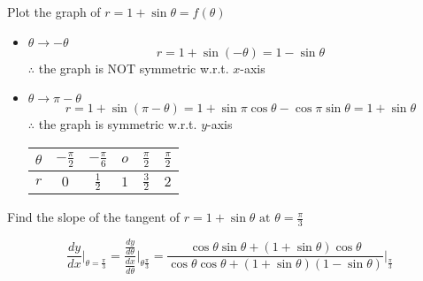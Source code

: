 \begin{eg}
Plot the graph of \(r = 1 + \sin \theta = f(\theta)\)
\begin{itemize}
\item \(\theta \to -\theta\)
\[r = 1 + \sin (-\theta) = 1 - \sin \theta\]
\(\therefore\) the graph is NOT symmetric w.r.t. \(x\)-axis 
\item \(\theta \to \pi - \theta\)
\[r = 1 + \sin (\pi - \theta) = 1 + \sin\pi \cos \theta - \cos\pi \sin \theta = 1 + \sin\theta\]
\(\therefore\) the graph is symmetric w.r.t. \(y\)-axis
\begin{center}
\begin{tabular}{c|c|c|c|c|c}
\(\theta\) & \(\displaystyle - \frac{\pi}{2}\) & \(\displaystyle - \frac{\pi}{6}\) & \(o\) & \(\displaystyle \frac{\pi}{2}\) & \(\displaystyle \frac{\pi}{2}\)\\ \hline
\(r\) & \(0\) & \(\displaystyle \frac{1}{2}\) & \(1\) & \(\displaystyle \frac{3}{2}\) & \(2\)
\end{tabular}
\end{center}
\end{itemize}
\end{eg}
\begin{eg}
Find the slope of the tangent of \(r = 1 + \sin \theta \text{ at } \theta = \displaystyle \frac{\pi}{3}\)

\soln
\[\displaystyle \frac{dy}{dx} \Big|_{\theta = \frac{\pi}{3}}= \frac{\frac{dy}{d\theta}}{\frac{dx}{d\theta}} \Big|_{\theta \frac{\pi}{3}} = \frac{\cos \theta \sin \theta + (1 + \sin \theta) \cos \theta}{\cos \theta \cos \theta + (1 + \sin \theta) (1 - \sin \theta)} \Big|_{\frac{\pi}{3}}\]
\end{eg}
